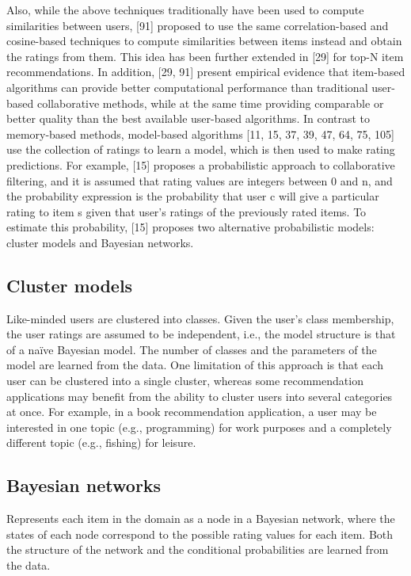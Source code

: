 Also, while the above techniques traditionally have been used to compute similarities between users, [91] proposed to use the same correlation-based and cosine-based techniques to compute similarities between items instead and obtain the ratings from them. This idea has been further extended in [29] for top-N item recommendations. In addition, [29, 91] present empirical evidence that item-based algorithms can provide better computational performance than traditional user-based collaborative methods, while at the same time providing comparable or better quality than the best available user-based algorithms.
In contrast to memory-based methods, model-based algorithms [11, 15, 37, 39, 47, 64, 75, 105] use the collection of ratings to learn a model, which is then used to make rating predictions. For example, [15] proposes a probabilistic approach to collaborative filtering, and it is assumed that rating values are integers between 0 and n, and the probability expression is the probability that user c will give a particular rating to item s given that user’s ratings of the previously rated items. To estimate this probability, [15] proposes two alternative probabilistic models: cluster models and Bayesian networks.

\subsection{Cluster models}
Like-minded users are clustered into classes. Given the user’s class membership, the user ratings are assumed to be independent, i.e., the model structure is that of a naïve Bayesian model. The number of classes and the parameters of the model are learned from the data.
One limitation of this approach is that each user can be clustered into a single cluster, whereas some recommendation applications may benefit from the ability to cluster users into several categories at once. For example, in a book recommendation application, a user may be interested in one topic (e.g., programming) for work purposes and a completely different topic (e.g., fishing) for leisure.

\subsection{Bayesian networks}
Represents each item in the domain as a node in a Bayesian network, where the states of each node correspond to the possible rating values for each item. Both the structure of the network and the conditional probabilities are learned from the data.

